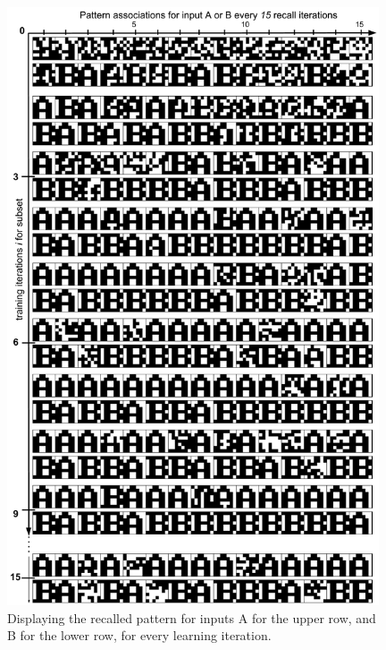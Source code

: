 \begin{figure}
    \centering
    \includegraphics[width=11cm]{fig/AB-pattern-associations-sync-tm0-dgw25}
    \caption{Displaying the recalled pattern for inputs A for the upper row, and B for the lower row, for every learning iteration.}
    \label{fig:pattern_associations_sync}
\end{figure}

